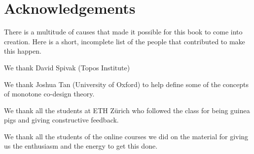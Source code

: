 
\section{Acknowledgements}

There is a multitude of causes that made it possible for this book to come into creation.
Here is a short, incomplete list of the people that contributed to make this happen.

We thank David Spivak  (Topos Institute)

We thank Joshua Tan (University of Oxford) to help define some of the concepts of monotone co-design theory.

We thank all the students at ETH Zürich who followed the class for being guinea pigs and giving constructive feedback.

We thank all the students of the online courses we did on the material for giving us the enthusiasm and the energy to get this done.
